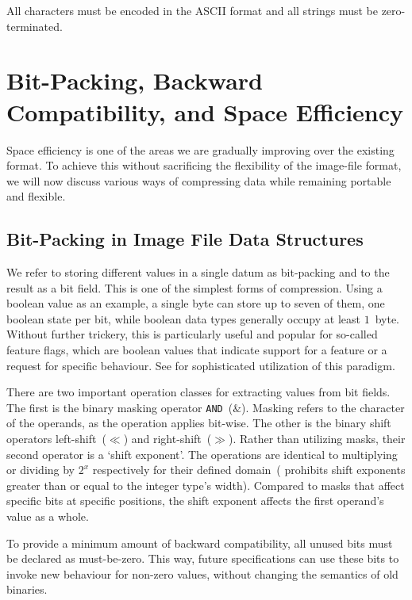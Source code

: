 \begin{requirement}
  All characters must be encoded in the \gls{ASCII} format and all strings must be zero-terminated.
\end{requirement}

\section{Bit-Packing, Backward Compatibility, and Space Efficiency}
\label{sec:encoding_eff}

Space efficiency is one of the areas we are gradually improving over the existing  format. To achieve this without sacrificing the flexibility of the \gls{image-file} format, we will now discuss various ways of compressing data while remaining portable and flexible.

\subsection{Bit-Packing in Image File Data Structures}

We refer to storing different values in a single datum as \gls{bit-packing} and to the result as a bit field. This is one of the simplest forms of compression. Using a boolean value as an example, a single \gls{byte} can store up to seven of them, one boolean state per bit, while boolean data types generally occupy at least $1$~\gls{byte}. Without further trickery, this is particularly useful and popular for so-called feature flags, which are boolean values that indicate support for a feature or a request for specific behaviour. See  for sophisticated utilization of this paradigm.

There are two important operation classes for extracting values from bit fields. The first is the binary masking operator \texttt{AND}~($\&$). Masking refers to the character of the operands, as the operation applies bit-wise. The other is the binary shift operators left-shift~($\ll$) and right-shift~($\gg$). Rather than utilizing masks, their second operator is a `shift exponent'. The operations are identical to multiplying or dividing by $2^x$ respectively for their defined domain~( prohibits shift exponents greater than or equal to the integer type's width). Compared to masks that affect specific bits at specific positions, the shift exponent affects the first operand's value as a whole.

To provide a minimum amount of backward compatibility, all unused bits must be declared as must-be-zero. This way, future specifications can use these bits to invoke new behaviour for non-zero values, without changing the semantics of old binaries.

